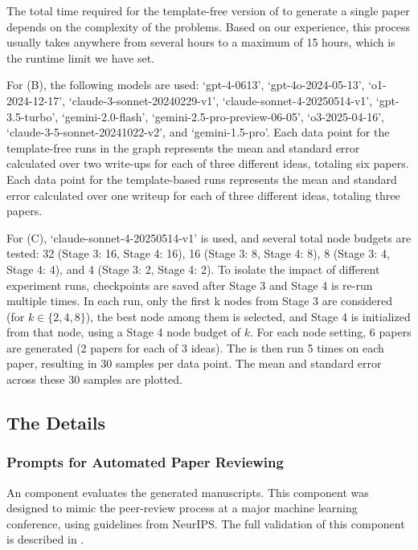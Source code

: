 \begin{appendices}
The total time required for the template-free version of \ouralgo to generate a single paper depends on the complexity of the problems. Based on our experience, this process usually takes anywhere from several hours to a maximum of 15 hours, which is the runtime limit we have set.

For (B), the following models are used: `gpt-4-0613', `gpt-4o-2024-05-13', `o1-2024-12-17', `claude-3-sonnet-20240229-v1', `claude-sonnet-4-20250514-v1', `gpt-3.5-turbo', `gemini-2.0-flash', `gemini-2.5-pro-preview-06-05', `o3-2025-04-16', `claude-3-5-sonnet-20241022-v2', and `gemini-1.5-pro'.
Each data point for the template-free runs in the graph represents the mean and standard error calculated over two write-ups for each of three different ideas, totaling six papers. Each data point for the template-based runs represents the mean and standard error calculated over one writeup for each of three different ideas, totaling three papers.

For (C), `claude-sonnet-4-20250514-v1' is used, and several total node budgets are tested: 32 (Stage 3: 16, Stage 4: 16), 16 (Stage 3: 8, Stage 4: 8), 8 (Stage 3: 4, Stage 4: 4), and 4 (Stage 3: 2, Stage 4: 2).
To isolate the impact of different experiment runs, checkpoints are saved after Stage 3 and Stage 4 is re-run multiple times.
In each run, only the first k nodes from Stage 3 are considered (for $k \in \{2, 4, 8\}$), the best node among them is selected, and Stage 4 is initialized from that node, using a Stage 4 node budget of $k$.
For each node setting, 6 papers are generated (2 papers for each of 3 ideas). The \ourreviewer is then run 5 times on each paper, resulting in 30 samples per data point. The mean and standard error across these 30 samples are plotted.


\subsection{The \ourreviewer Details}\label{app:reviewer_details}
\subsubsection{Prompts for Automated Paper Reviewing}
\label{app:v1_prompts_reviewer}
An \ourreviewer component evaluates the generated manuscripts. This component was designed to mimic the peer-review process at a major machine learning conference, using guidelines from NeurIPS. The full validation of this component is described in .


\end{appendices}
